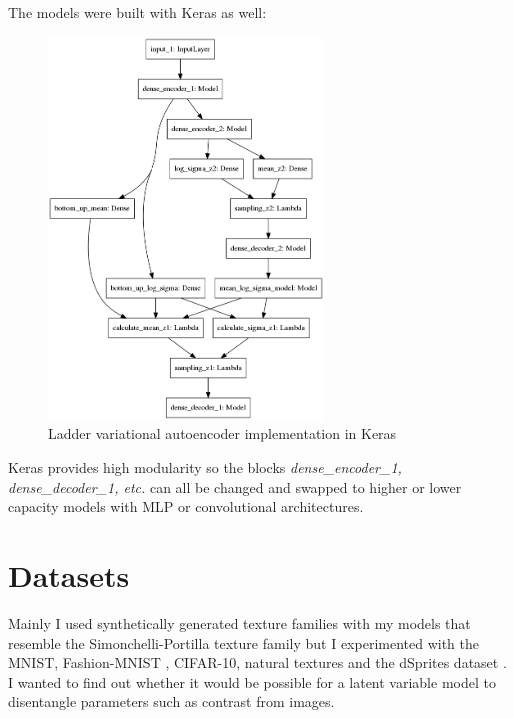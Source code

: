 \documentclass[11pt, english]{article}
\begin{document}
\vspace{3mm}

\par The models were built with Keras \cite{chollet2015keras} as well:

\vspace{3mm}

\begin{figure}[H]
    \centering
    \includegraphics[width=0.65\textwidth]{dense_lvae_keras.png}
    \caption{Ladder variational autoencoder implementation in Keras}
    \label{fig:keras_lvae}
\end{figure}

\vspace{3mm}

\par Keras provides high modularity so the blocks \textit{dense\_encoder\_1, dense\_decoder\_1, etc.} can all be
changed and swapped to higher or lower capacity models with MLP or convolutional architectures.

\newpage

\section{Datasets}

\vspace{7mm}

\par Mainly I used synthetically generated texture families with my models that resemble the Simonchelli-Portilla texture family \cite{portilla2003image} but I experimented with the MNIST, Fashion-MNIST \cite{xiao2017fashion}, CIFAR-10, natural textures and the dSprites dataset \cite{matthey2017dsprites}. I wanted to find out whether it would be possible for a latent variable model to disentangle parameters such as contrast from images.
\end{document}
